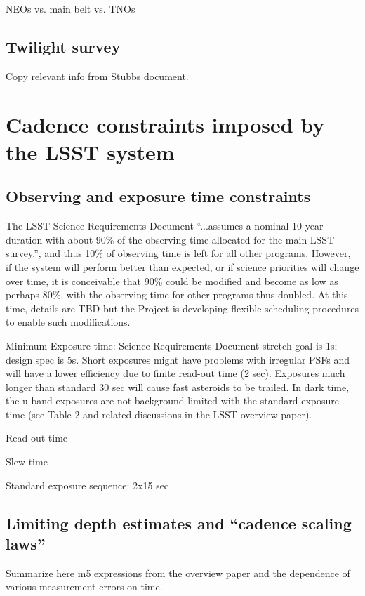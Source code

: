 \documentclass[DM,lsstdraft,toc,usenatbib]{lsstdoc}
\begin{document}
NEOs vs. main belt vs. TNOs 


\subsection{Twilight survey} 

Copy relevant info from Stubbs document. 



\section{Cadence constraints imposed by the LSST system} 


\subsection{Observing and exposure time constraints}

The LSST Science Requirements Document  ``...assumes a nominal 10-year duration with about 90\% 
of the observing time allocated for the main LSST survey.'', and thus 10\% of observing time is left for 
all other programs. However, if the system will perform better than expected, or if science priorities 
will change over time, it is conceivable that 90\% could be modified and become as low as perhaps 80\%, 
with the observing time for other programs thus doubled. At this time, details are TBD but the Project
is developing flexible scheduling procedures to enable such modifications. 

Minimum Exposure time: Science Requirements Document stretch goal is 1s; design spec is 5s.
Short exposures might have problems with irregular PSFs and will have a lower efficiency due to
finite read-out time (2 sec). Exposures much longer than standard 30 sec will cause fast asteroids
to be trailed. In dark time, the u band exposures are not background limited with the standard
exposure time (see Table 2 and related discussions in the LSST overview paper). 

Read-out time 

Slew time 

Standard exposure sequence: 2x15 sec 


\subsection{Limiting depth estimates and ``cadence scaling laws''} 

Summarize here m5 expressions from the overview paper and the dependence
of various measurement errors on time. 
\end{document}
